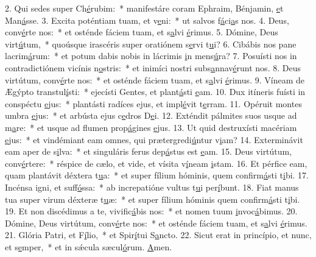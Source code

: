 2. Qui sedes super Ch\uline{é}rubim:~* manifestáre coram Ephraim, Bénjamin, \uline{e}t Man\uline{á}sse.
3. Excita poténtiam tuam, et v\uline{e}ni:~* ut salvos f\uline{á}ci\uline{a}s nos.
4. Deus, conv\uline{é}rte nos:~* et osténde fáciem tuam, et s\uline{a}lvi \uline{é}rimus.
5. Dómine, Deus virt\uline{ú}tum,~* quoúsque irascéris super oratiónem s\uline{e}rvi t\uline{u}i?
6. Cibábis nos pane lacrim\uline{á}rum:~* et potum dabis nobis in lácrimis \uline{i}n mens\uline{ú}ra?
7. Posuísti nos in contradictiónem vicínis n\uline{o}stris:~* et inimíci nostri subs\uline{a}nnav\uline{é}runt nos.
8. Deus virtútum, conv\uline{é}rte nos:~* et osténde fáciem tuam, et s\uline{a}lvi \uline{é}rimus.
9. Víneam de Ægýpto transtul\uline{í}sti:~* ejecísti Gentes, et plant\uline{á}sti \uline{e}am.
10. Dux itíneris fuísti in conspéctu \uline{e}jus:~* plantásti radíces ejus, et impl\uline{é}vit t\uline{e}rram.
11. Opéruit montes umbra \uline{e}jus:~* et arbústa ejus c\uline{e}dros D\uline{e}i.
12. Exténdit pálmites suos usque ad m\uline{a}re:~* et usque ad flumen prop\uline{á}gines \uline{e}jus.
13. Ut quid destruxísti macériam \uline{e}jus:~* et vindémiant eam omnes, qui prætergredi\uline{ú}ntur v\uline{i}am?
14. Exterminávit eam aper de s\uline{i}lva:~* et singuláris ferus dep\uline{á}stus est \uline{e}am.
15. Deus virtútum, conv\uline{é}rtere:~* réspice de cælo, et vide, et vísita v\uline{í}neam \uline{i}stam.
16. Et pérfice eam, quam plantávit déxtera t\uline{u}a:~* et super fílium hóminis, quem confirm\uline{á}sti t\uline{i}bi.
17. Incénsa igni, et suff\uline{ó}ssa:~* ab increpatióne vultus t\uline{u}i per\uline{í}bunt.
18. Fiat manus tua super virum déxteræ t\uline{u}æ:~* et super fílium hóminis quem confirm\uline{á}sti t\uline{i}bi.
19. Et non discédimus a te, vivific\uline{á}bis nos:~* et nomen tuum \uline{i}nvoc\uline{á}bimus.
20. Dómine, Deus virtútum, conv\uline{é}rte nos:~* et osténde fáciem tuam, et s\uline{a}lvi \uline{é}rimus.
21. Glória Patri, et F\uline{í}lio,~* et Spir\uline{í}tui S\uline{a}ncto.
22. Sicut erat in princípio, et nunc, et s\uline{e}mper,~* et in sǽcula sæcul\uline{ó}rum. \uline{A}men.
